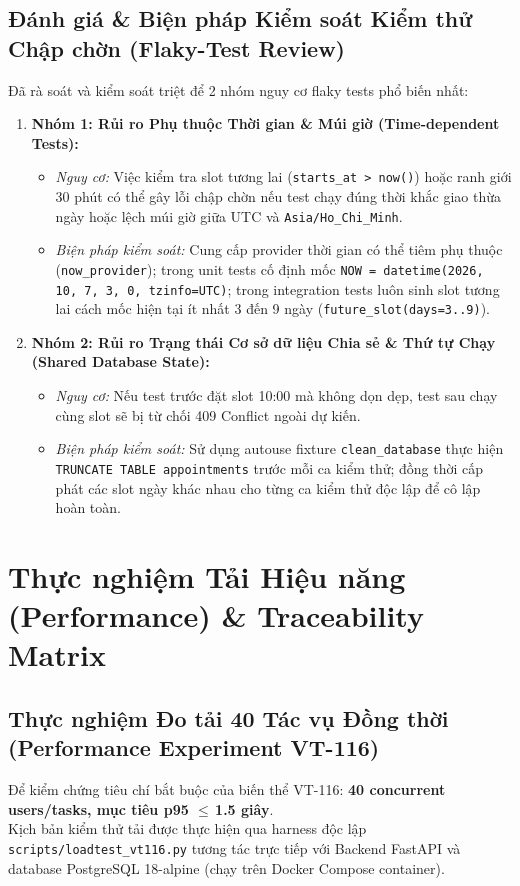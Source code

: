 \documentclass[10pt,a4paper]{article}
\newcommand{\LE}{\ensuremath{\leq}\,}
\newcommand{\codepath}[1]{{\ttfamily\scriptsize\nolinkurl{#1}}}
\begin{document}
\subsection{Đánh giá \& Biện pháp Kiểm soát Kiểm thử Chập chờn (Flaky-Test Review)}
Đã rà soát và kiểm soát triệt để 2 nhóm nguy cơ flaky tests phổ biến nhất:
\begin{enumerate}[leftmargin=1.1em,itemsep=0.3pt]
  \item \textbf{Nhóm 1: Rủi ro Phụ thuộc Thời gian \& Múi giờ (Time-dependent Tests):}
    \begin{itemize}[leftmargin=0.9em,itemsep=0.1pt]
      \item \textit{Nguy cơ:} Việc kiểm tra slot tương lai (\texttt{starts\_at > now()}) hoặc ranh giới 30 phút có thể gây lỗi chập chờn nếu test chạy đúng thời khắc giao thừa ngày hoặc lệch múi giờ giữa UTC và \texttt{Asia/Ho\_Chi\_Minh}.
      \item \textit{Biện pháp kiểm soát:} Cung cấp provider thời gian có thể tiêm phụ thuộc (\texttt{now\_provider}); trong unit tests cố định mốc \texttt{NOW = datetime(2026, 10, 7, 3, 0, tzinfo=UTC)}; trong integration tests luôn sinh slot tương lai cách mốc hiện tại ít nhất 3 đến 9 ngày (\texttt{future\_slot(days=3..9)}).
    \end{itemize}
  \item \textbf{Nhóm 2: Rủi ro Trạng thái Cơ sở dữ liệu Chia sẻ \& Thứ tự Chạy (Shared Database State):}
    \begin{itemize}[leftmargin=0.9em,itemsep=0.1pt]
      \item \textit{Nguy cơ:} Nếu test trước đặt slot 10:00 mà không dọn dẹp, test sau chạy cùng slot sẽ bị từ chối 409 Conflict ngoài dự kiến.
      \item \textit{Biện pháp kiểm soát:} Sử dụng autouse fixture \texttt{clean\_database} thực hiện \texttt{TRUNCATE TABLE appointments} trước mỗi ca kiểm thử; đồng thời cấp phát các slot ngày khác nhau cho từng ca kiểm thử độc lập để cô lập hoàn toàn.
    \end{itemize}
\end{enumerate}

\clearpage
\section{Thực nghiệm Tải Hiệu năng (Performance) \& Traceability Matrix}

\subsection{Thực nghiệm Đo tải 40 Tác vụ Đồng thời (Performance Experiment VT-116)}
Để kiểm chứng tiêu chí bắt buộc của biến thể VT-116: \textbf{40 concurrent users/tasks, mục tiêu p95 \LE 1.5 giây}.\\
Kịch bản kiểm thử tải được thực hiện qua harness độc lập \codepath{scripts/loadtest_vt116.py} tương tác trực tiếp với Backend FastAPI và database PostgreSQL 18-alpine (chạy trên Docker Compose container).
\end{document}
